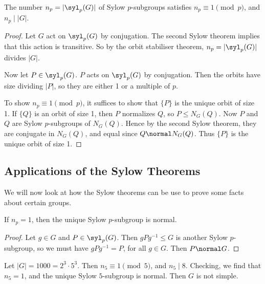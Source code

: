 \begin{theorem}
	The number $n_p = |\syl_p(G)|$ of Sylow $p$-subgroups satisfies $n_p \equiv 1 \pmod{p}$, and $n_p \mid |G|$.
\end{theorem}
\begin{proof}
	Let $G$ act on $\syl_p(G)$ by conjugation. The second Sylow theorem implies that this action is transitive. So by the orbit stabiliser theorem, $n_p = |\syl_p(G)|$ divides $|G|$.

	Now let $P \in \syl_p(G)$. $P$ acts on $\syl_p(G)$ by conjugation. Then the orbits have size dividing $|P|$, so they are either 1 or a multiple of $p$.

	To show $n_p \equiv 1 \pmod{p}$, it suffices to show that $\{P\}$ is the unique orbit of size 1. If $\{Q\}$ is an orbit of size 1, then $P$ normalizes $Q$, so $P \leq N_G(Q)$. Now $P$ and $Q$ are Sylow $p$-subgroups of $N_G(Q)$. Hence by the second Sylow theorem, they are conjugate in $N_G(Q)$, and equal since $Q \normal N_G(Q)$. Thus $\{P\}$ is the unique orbit of size 1.
\end{proof}


\subsection{Applications of the Sylow Theorems}

We will now look at how the Sylow theorems can be use to prove some facts about certain groups.

\begin{corollary}
	If $n_p = 1$, then the unique Sylow $p$-subgroup is normal.
\end{corollary}
\begin{proof}
Let $g \in G$ and $P \in \syl_p(G)$. Then $gPg^{-1} \leq G$ is another Sylow $p$-subgroup, so we must have $gPg^{-1} = P$, for all $g \in G$. Then $P \normal G$.
\end{proof}

\begin{example}
Let $|G| = 1000 = 2^3 \cdot 5^3$. Then $n_5 \equiv 1 \pmod{5}$, and $n_5 \mid 8$. Checking, we find that $n_5 = 1$, and the unique Sylow $5$-subgroup is normal. Then $G$ is not simple.
\end{example}


